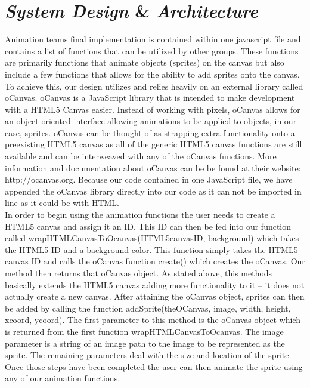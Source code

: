 \documentclass[12pt]{article}
\begin{document}
\section{\emph{System Design} \& \emph{Architecture}}
Animation teams final implementation is contained within one javascript file and contains a list of functions that can be utilized by other groups. These functions are primarily functions that animate objects (sprites) on the canvas but also include a few functions that allows for the ability to add sprites onto the canvas. To achieve this, our design utilizes and relies heavily on an external library called oCanvas. oCanvas is a JavaScript library that is intended to make development with a HTML5 Canvas easier. Instead of working with pixels, oCanvas allows for an object oriented interface allowing animations to be applied to objects, in our case, sprites. oCanvas can be thought of as strapping extra functionality onto a preexisting HTML5 canvas as all of the generic HTML5 canvas functions are still available and can be interweaved with any of the oCanvas functions. More information and documentation about oCanvas can be be found at their website: http://ocanvas.org. Because our code contained in one JavaScript file, we have appended the oCanvas library directly into our code as it can not be imported in line as it could be with HTML. \\

In order to begin using the animation functions the user needs to create a HTML5 canvas and assign it an ID. This ID can then be fed into our function called wrapHTMLCanvasToOcanvas(HTML5canvasID, background) which takes the HTML5 ID and a background color. This function simply takes the HTML5 canvas ID and calls the oCanvas function create() which creates the oCanvas. Our method then returns that oCanvas object. As stated above, this methods basically extends the HTML5 canvas adding more functionality to it -- it does not actually create a new canvas. After attaining the oCanvas object, sprites can then be added by calling the function addSprite(theOCanvas, image, width, height, xcoord, ycoord). The first parameter to this method is the oCanvas object which is returned from the first function wrapHTMLCanvasToOcanvas. The image parameter is a string of an image path to the image to be represented as the sprite. The remaining parameters deal with the size and location of the sprite. Once those steps have been completed the user can then animate the sprite using any of our animation functions. \\
\end{document}
